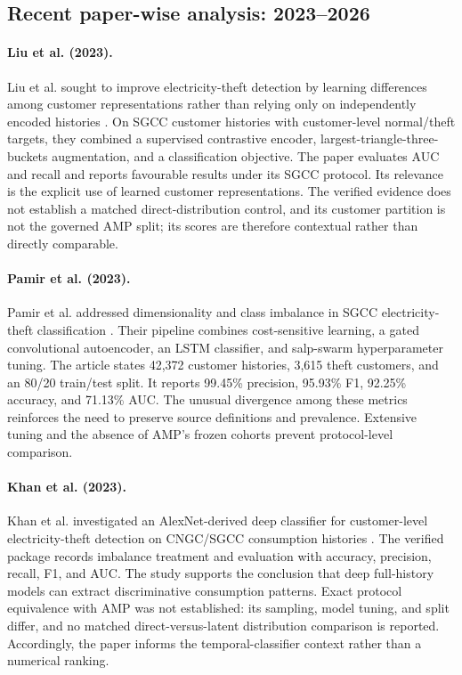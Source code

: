\subsection{Recent paper-wise analysis: 2023--2026}

\paragraph{Liu et al. (2023).}
Liu et al. sought to improve electricity-theft detection by learning differences among customer representations rather than relying only on independently encoded histories \cite{Liu2023ContrastiveETD}. On SGCC customer histories with customer-level normal/theft targets, they combined a supervised contrastive encoder, largest-triangle-three-buckets augmentation, and a classification objective. The paper evaluates AUC and recall and reports favourable results under its SGCC protocol. Its relevance is the explicit use of learned customer representations. The verified evidence does not establish a matched direct-distribution control, and its customer partition is not the governed AMP split; its scores are therefore contextual rather than directly comparable.

\paragraph{Pamir et al. (2023).}
Pamir et al. addressed dimensionality and class imbalance in SGCC electricity-theft classification \cite{Pamir2023EnergyOptimization}. Their pipeline combines cost-sensitive learning, a gated convolutional autoencoder, an LSTM classifier, and salp-swarm hyperparameter tuning. The article states 42,372 customer histories, 3,615 theft customers, and an 80/20 train/test split. It reports 99.45\% precision, 95.93\% F1, 92.25\% accuracy, and 71.13\% AUC. The unusual divergence among these metrics reinforces the need to preserve source definitions and prevalence. Extensive tuning and the absence of AMP's frozen cohorts prevent protocol-level comparison.

\paragraph{Khan et al. (2023).}
Khan et al. investigated an AlexNet-derived deep classifier for customer-level electricity-theft detection on CNGC/SGCC consumption histories \cite{Khan2023AlexNet}. The verified package records imbalance treatment and evaluation with accuracy, precision, recall, F1, and AUC. The study supports the conclusion that deep full-history models can extract discriminative consumption patterns. Exact protocol equivalence with AMP was not established: its sampling, model tuning, and split differ, and no matched direct-versus-latent distribution comparison is reported. Accordingly, the paper informs the temporal-classifier context rather than a numerical ranking.


